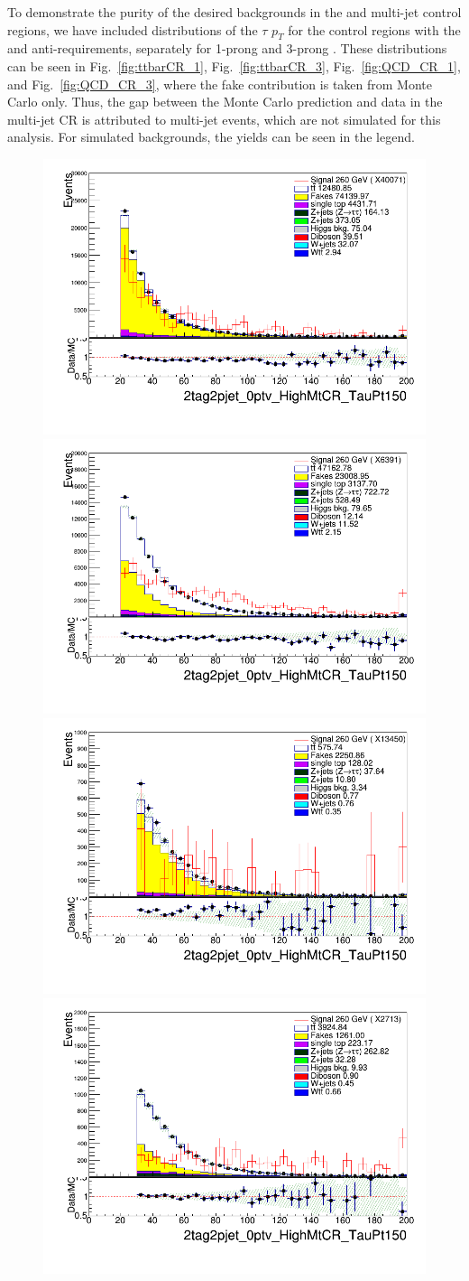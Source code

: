 To demonstrate the purity of the desired backgrounds in the \ttbar and multi-jet control regions, 
we have included distributions of the $\tau$ $p_T$ for the control regions with the \tauhad and 
anti-\tauhad requirements, separately for 1-prong and 3-prong \tauhad.  These distributions can 
be seen in Fig.~\ref{fig:ttbarCR_1}, Fig.~\ref{fig:ttbarCR_3}, Fig.~\ref{fig:QCD_CR_1},  and Fig.~\ref{fig:QCD_CR_3}, 
where the fake contribution is taken from Monte Carlo only.  Thus, the gap between the Monte Carlo prediction and data in the multi-jet CR is attributed to multi-jet events, which are not simulated for this analysis. For simulated backgrounds, the yields can be seen in the legend.

\begin{figure}
\centering
\includegraphics[width=.45\textwidth]{figures/lephadFF/SLT/2tag2pjet_0ptv_HighMtCR_TauPt150_CR_SLT_ALL_ttWeight_1.png}
\includegraphics[width=.45\textwidth]{figures/lephadFF/SLT/2tag2pjet_0ptv_HighMtCR_TauPt150_SR_SLT_ALL_ttWeight_1.png} \\
\includegraphics[width=.45\textwidth]{figures/lephadFF/LTT/2tag2pjet_0ptv_HighMtCR_TauPt150_CR_LTT_ALL_ttWeight_1.png}
\includegraphics[width=.45\textwidth]{figures/lephadFF/LTT/2tag2pjet_0ptv_HighMtCR_TauPt150_SR_LTT_ALL_ttWeight_1.png}\\

\end{figure}
